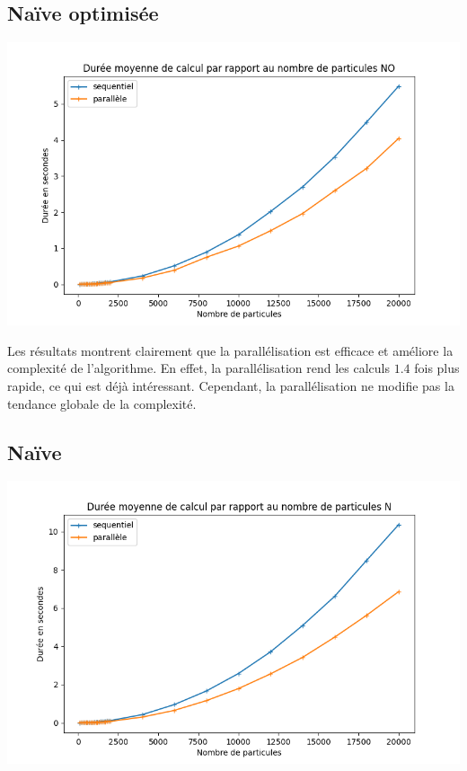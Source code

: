 \subsection{Naïve optimisée}
\begin{center}
\includegraphics[scale=0.6]{./resultats/comparison_NO.png}
\captionsetup{hypcap=false}
\label{fig14}
\end{center}


Les résultats montrent clairement que la parallélisation est efficace et améliore la complexité de l'algorithme.
En effet, la parallélisation rend les calculs $1.4$ fois plus rapide, ce qui est déjà intéressant. Cependant, la parallélisation ne modifie pas la tendance globale de la complexité.

\subsection{Naïve}
\begin{center}
\includegraphics[scale=0.6]{./resultats/comparison_N.png}
\captionsetup{hypcap=false}
\label{fig15}
\end{center}


